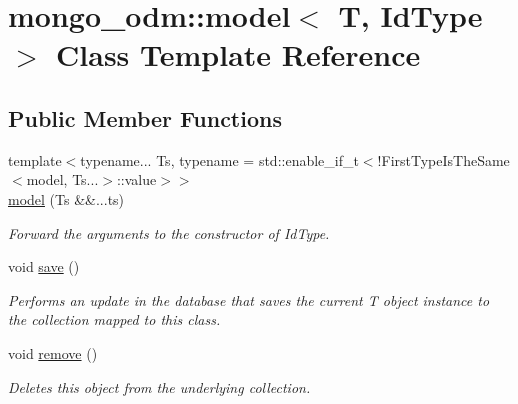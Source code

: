 \hypertarget{classmongo__odm_1_1model}{}\section{mongo\+\_\+odm\+:\+:model$<$ T, Id\+Type $>$ Class Template Reference}
\label{classmongo__odm_1_1model}
\subsection*{Public Member Functions}
\begin{DoxyCompactItemize}
\item 
{\footnotesize template$<$typename... Ts, typename  = std\+::enable\+\_\+if\+\_\+t$<$!\+First\+Type\+Is\+The\+Same$<$model, Ts...$>$\+::value$>$$>$ }\\\hyperlink{classmongo__odm_1_1model_ae00ec1da4db3b0851ccb3990a33a8f8e}{model} (Ts \&\&...ts)
\begin{DoxyCompactList}\small\item\em Forward the arguments to the constructor of Id\+Type. \end{DoxyCompactList}\item 
void \hyperlink{classmongo__odm_1_1model_a248cf30be3ee63741af5396a337b2694}{save} ()
\begin{DoxyCompactList}\small\item\em Performs an update in the database that saves the current T object instance to the collection mapped to this class. \end{DoxyCompactList}\item 
void \hyperlink{classmongo__odm_1_1model_a63b9538d2226531814bee3b7e7d26586}{remove} ()
\begin{DoxyCompactList}\small\item\em Deletes this object from the underlying collection. \end{DoxyCompactList}\end{DoxyCompactItemize}
